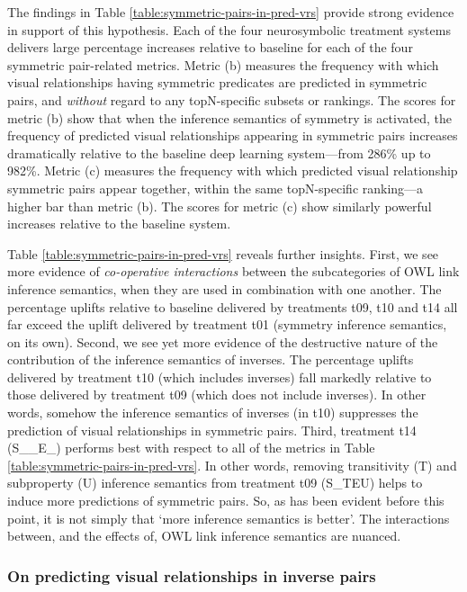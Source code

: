 \documentclass[]{jair}
\begin{document}
The findings in Table \ref{table:symmetric-pairs-in-pred-vrs} provide strong evidence in support of this hypothesis.
Each of the four neurosymbolic treatment systems delivers large percentage increases relative to baseline for each of the four symmetric pair-related metrics.
Metric (b) measures the frequency with which visual relationships having symmetric predicates are predicted in symmetric pairs, and \emph{without} regard to any topN-specific subsets or rankings.
The scores for metric (b) show that when the inference semantics of symmetry is activated, the frequency of predicted visual relationships appearing in symmetric pairs increases dramatically relative to the baseline deep learning system---from 286\% up to 982\%.
Metric (c) measures the frequency with which predicted visual relationship symmetric pairs appear together, within the same topN-specific ranking---a higher bar than metric (b).
The scores for metric (c) show similarly powerful increases relative to the baseline system.

Table \ref{table:symmetric-pairs-in-pred-vrs} reveals further insights.
First, we see more evidence of \emph{co-operative interactions} between the subcategories of OWL link inference semantics, when they are used in combination with one another.
The percentage uplifts relative to baseline delivered by treatments t09, t10 and t14 all far exceed the uplift delivered by treatment t01 (symmetry inference semantics, on its own).
Second, we see yet more evidence of the destructive nature of the contribution of the inference semantics of inverses.
The percentage uplifts delivered by treatment t10 (which includes inverses) fall markedly relative to those delivered by treatment t09 (which does not include inverses).
In other words, somehow the inference semantics of inverses (in t10) suppresses the prediction of visual relationships in symmetric pairs.
Third, treatment t14 (S\_\_E\_) performs best with respect to all of the metrics in Table \ref{table:symmetric-pairs-in-pred-vrs}.
In other words, removing transitivity (T) and subproperty (U) inference semantics from treatment t09 (S\_TEU) helps to induce more predictions of symmetric pairs.
So, as has been evident before this point, it is not simply that `more inference semantics is better'.
The interactions between, and the effects of, OWL link inference semantics are nuanced.

\subsubsection{On predicting visual relationships in inverse pairs}
\end{document}
